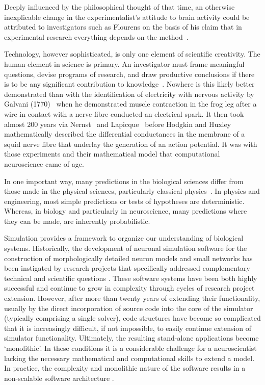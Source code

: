 \documentclass[11pt,3p,twocolumn]{JMN}
\begin{document}
Deeply influenced by the philosophical thought of that time, an otherwise inexplicable change in the experimentalist's attitude to brain activity could be attributed to investigators such as Flourens on the basis of his claim that in experimental research everything depends on the method~\citep{flourens24}.

Technology, however sophisticated, is only one element of scientific creativity. The human element in science is primary. An investigator must frame meaningful questions, devise programs of research, and draw productive conclusions if there is to be any significant contribution to knowledge~\citep{clarke87}. Nowhere is this likely better demonstrated than with the identification of electricity with nervous activity by Galvani (1770)~\citet{galvani91} when he demonstrated muscle contraction in the frog leg after a wire in contact with a nerve fibre conducted an electrical spark. It then took almost 200 years via Nernst~\citet{nernst89} and Lapicque~\citet{lapicque07} before Hodgkin and Huxley~\citet{hodgkin52e} mathematically described the differential conductances in the membrane of a squid nerve fibre that underlay the generation of an action potential. It was with those experiments and their mathematical model that computational neuroscience came of age.

In one important way, many predictions in the biological sciences differ from those made in the physical sciences, particularly classical physics~\citep{darwin71}. In physics and engineering, most simple predictions or tests of hypotheses are deterministic. Whereas, in biology and particularly in neuroscience, many predictions where they can be made, are inherently probabilistic.

Simulation provides a framework to organize our understanding of biological systems. Historically, the development of neuronal simulation software for the construction of morphologically detailed neuron models and small networks has been instigated by research projects that specifically addressed complementary technical and scientific questions \cite{Moore:2010vn}. These software systems have been both highly successful and continue to grow in complexity through cycles of research project extension. However, after more than twenty years of extending their functionality, usually by the direct incorporation of source code into the core of the simulator (typically comprising a single solver), code structures have become so complicated that it is increasingly difficult, if not impossible, to easily continue extension of simulator functionality. Ultimately, the resulting stand-alone applications become `monolithic'. In these conditions it is a considerable challenge for a neuroscientist lacking the necessary mathematical and computational skills to extend a model. In practice, the complexity and monolithic nature of the software results in a non-scalable software architecture \cite{jaeger02:_comput_neuros_realis_model_exper}.
\end{document}
